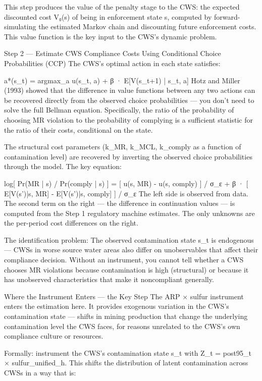 This step produces the value of the penalty stage to the CWS: the expected discounted cost V₀(s) of being in enforcement state s, computed by forward-simulating the estimated Markov chain and discounting future enforcement costs. This value function is the key input to the CWS's dynamic problem.

Step 2 — Estimate CWS Compliance Costs Using Conditional Choice Probabilities (CCP)
The CWS's optimal action in each state satisfies:


a*(s_t) = argmax_a { u(s_t, a) + β · E[V(s_{t+1}) | s_t, a] }
Hotz and Miller (1993) showed that the difference in value functions between any two actions can be recovered directly from the observed choice probabilities — you don't need to solve the full Bellman equation. Specifically, the ratio of the probability of choosing MR violation to the probability of complying is a sufficient statistic for the ratio of their costs, conditional on the state.

The structural cost parameters (k_MR, k_MCL, k_comply as a function of contamination level) are recovered by inverting the observed choice probabilities through the model. The key equation:


log[ Pr(MR | s) / Pr(comply | s) ] = [ u(s, MR) - u(s, comply) ] / σ_ε
                                    + β · [ E[V(s')|s, MR] - E[V(s')|s, comply] ] / σ_ε
The left side is observed from data. The second term on the right — the difference in continuation values — is computed from the Step 1 regulatory machine estimates. The only unknowns are the per-period cost differences on the right.

The identification problem: The observed contamination state s_t is endogenous — CWSs in worse source water areas also differ on unobservables that affect their compliance decision. Without an instrument, you cannot tell whether a CWS chooses MR violations because contamination is high (structural) or because it has unobserved characteristics that make it noncompliant generally.

Where the Instrument Enters — the Key Step
The ARP × sulfur instrument enters the estimation here. It provides exogenous variation in the CWS's contamination state — shifts in mining production that change the underlying contamination level the CWS faces, for reasons unrelated to the CWS's own compliance culture or resources.

Formally: instrument the CWS's contamination state s_t with Z_t = post95_t × sulfur_unified_h. This shifts the distribution of latent contamination across CWSs in a way that is:

